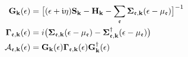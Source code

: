 \begin{align*}
  \G_\kk(\E)&=\big[(\E+\im\eta)\SO_\kk - \HH_\kk - \sum_\idxE\SE_{\idxE,\kk}(\E-\mu_\idxE)\big]^{-1}
  \\
  \Scat_{\idxE,\kk}(\E) &=i\big(\SE_{\idxE,\kk}(\E-\mu_\idxE)-\SE^\dagger_{\idxE,\kk}(\E-\mu_\idxE)\big)
  \\
  \Spec_{\idxE,\kk}(\E) &=\G_\kk(\E)\Scat_{\idxE,\kk}(\E)\G_\kk^\dagger(\E)
\end{align*}